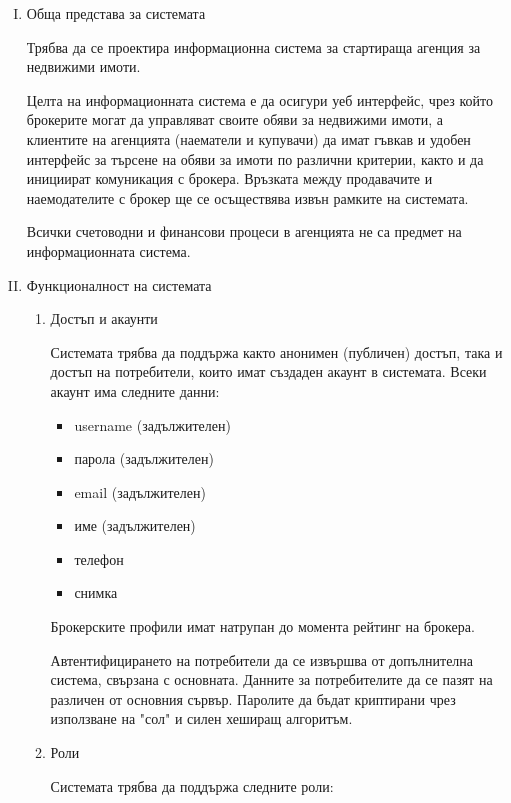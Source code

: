 \documentclass[]{article}
\begin{document}
\begin{enumerate}[I.]
	\item {Обща представа за системата
	
Трябва да се проектира информационна система за стартираща агенция за недвижими имоти.

Целта на информационната система е да осигури уеб интерфейс, чрез който брокерите могат да управляват своите обяви за недвижими имоти, а клиентите на агенцията (наематели и купувачи) да
имат гъвкав и удобен интерфейс за търсене на обяви за имоти по различни критерии, както и да инициират комуникация с брокера. Връзката между продавачите и наемодателите с брокер ще се осъществява извън рамките на системата.

Всички счетоводни и финансови процеси в агенцията не са предмет на информационната система.
	}
	
	\item {Функционалност на системата
		\begin{enumerate}[1.]
			\item {Достъп и акаунти

				Системата трябва да поддържа както анонимен (публичен) достъп, така и достъп на потребители, които имат създаден акаунт в системата. Всеки акаунт има следните данни:

				\begin{itemize}
					\item username (задължителен)
					\item парола (задължителен)
					\item email (задължителен)
					\item име (задължителен)
					\item телефон
					\item снимка
				\end{itemize}

Брокерските профили имат натрупан до момента рейтинг на брокера.
				
Автентифицирането на потребители да се извършва от допълнителна система, свързана с основната. Данните за потребителите да се пазят на различен от основния сървър. 
Паролите да бъдат криптирани чрез използване на "сол" и силен хеширащ алгоритъм. 


				
			}
			\item {Роли			

				Системата трябва да поддържа следните роли:
	
}
\end{enumerate}}
\end{enumerate}
\end{document}
